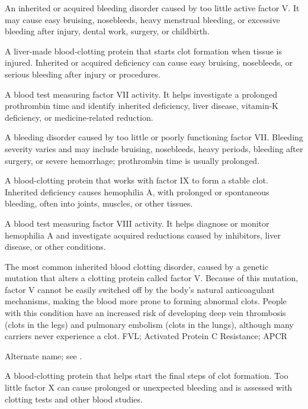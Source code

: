  An inherited or acquired bleeding disorder caused by too little active factor V. It may cause easy bruising, nosebleeds, heavy menstrual bleeding, or excessive bleeding after injury, dental work, surgery, or childbirth.

 A liver-made blood-clotting protein that starts clot formation when tissue is injured. Inherited or acquired deficiency can cause easy bruising, nosebleeds, or serious bleeding after injury or procedures.

 A blood test measuring factor VII activity. It helps investigate a prolonged prothrombin time and identify inherited deficiency, liver disease, vitamin-K deficiency, or medicine-related reduction.

 A bleeding disorder caused by too little or poorly functioning factor VII. Bleeding severity varies and may include bruising, nosebleeds, heavy periods, bleeding after surgery, or severe hemorrhage; prothrombin time is usually prolonged.

 A blood-clotting protein that works with factor IX to form a stable clot. Inherited deficiency causes hemophilia A, with prolonged or spontaneous bleeding, often into joints, muscles, or other tissues.

 A blood test measuring factor VIII activity. It helps diagnose or monitor hemophilia A and investigate acquired reductions caused by inhibitors, liver disease, or other conditions.

 The most common inherited blood clotting disorder, caused by a genetic mutation that alters a clotting protein called factor V. Because of this mutation, factor V cannot be easily switched off by the body's natural anticoagulant mechanisms, making the blood more prone to forming abnormal clots. People with this condition have an increased risk of developing deep vein thrombosis (clots in the legs) and pulmonary embolism (clots in the lungs), although many carriers never experience a clot.
\synonyms
FVL; Activated Protein C Resistance; APCR

 Alternate name; see .

 A blood-clotting protein that helps start the final steps of clot formation. Too little factor X can cause prolonged or unexpected bleeding and is assessed with clotting tests and other blood studies.

